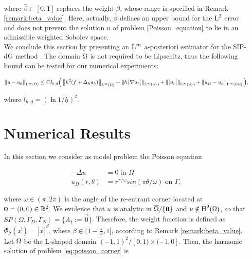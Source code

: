 \documentclass[a4paper,11pt]{article}
\begin{document}
{where $\hat{\beta} \in [0,1]$ replaces the weight $\beta$, whose range is specified in Remark \ref{remark:beta_value}. Here, actually, $\hat{\beta}$ defines an upper bound for the $\operatorname L^{2}$ error and does not prevent the solution $u$ of problem \ref{Poisson_equation} to lie in an admissible weighted Sobolev space. \\

We conclude this section by presenting  an $\operatorname L^{\infty}$ a-posteriori estimator for the SIP-dG method \cite{ DG:2012} .  The domain $\Omega$ is not required to be Lipschitz, thus the following bound can be tested for our numerical experiments:

\begin{equation}\label{eq:a-posteriori_Linfty}
  \left\|u-u_{h}\right\|_{\operatorname L^{\infty}(\Omega)} \leq  C l_{h,d} \Big( \left\|h^{2}(f + \Delta_{h}u_{h})\right\|_{\operatorname L^{\infty}(\Omega)} + \left\|h \left[ \nabla u_{h}\right]\right\|_{\operatorname L^{\infty}(\mathscr E_{I})} + \left\|\left[ u_{h}\right]\right\|_{\operatorname L^{\infty}(\mathscr E_{I})} + \left\|u_{D} - u_{h}\right\|_{\operatorname L^{\infty}(\partial \Omega)} \Big),
\end{equation}

where $l_{h,d} = (\ln 1/\underline{h})^{2}$. 


\section{Numerical Results}
\label{sec:Numerical_results}
In this section we consider as model problem the Poisson equation

\begin{equation}
    \begin{split}
        - \Delta u &= 0 \text{ in } \Omega\\
        u_{D}(r,\theta) &= r^{\pi/\omega} sin\left(\pi\theta / \omega \right) \text{ on } \Gamma,
    \end{split}
\label{eq:poisson_corner}
\end{equation}

where $\omega \in (\pi,2\pi)$ is the angle of the re-entrant corner located at $\boldsymbol 0 = (0,0) \in \mathbb R^{2}$. 
We evidence that $u$ is analytic in $\overline{\Omega}\slash\{\boldsymbol 0\}$ and $u \notin \operatorname H^{2}(\Omega)$, so that $\textit{SP}(\Omega,\Gamma_{D},\Gamma_{N}) = \{A_{1} := \vec{0}\}$. Therefore, the weight function is defined as $\Phi_{\beta}(\vec{x}) = |\vec{x}|^{\beta}$, where $\beta \in (1 - \frac{\pi}{\omega},1]$, according to Remark \ref{remark:beta_value}. Let $\Omega$ be the L-shaped domain $ (-1,1)^{2} \slash [0,1) \times (-1,0]$. Then, the harmonic solution of problem \eqref{eq:poisson_corner} is 

}
\end{document}
